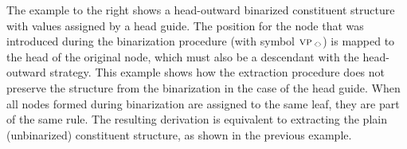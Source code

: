\documentclass[../../document.tex]{subfiles}
\begin{document}
    \begin{wrapfigure}[6]{r}{0pt}
        
    \end{wrapfigure}
    \parexample
    The example to the right shows a head-outward binarized constituent structure with values assigned by a head guide.
    The position for the node that was introduced during the binarization procedure (with symbol \(\cn{vp\,\binsym{}}\)) is mapped to the head of the original node, which must also be a descendant with the head-outward strategy.
    This example shows how the extraction procedure does not preserve the structure from the binarization in the case of the head guide.
    When all nodes formed during binarization are assigned to the same leaf, they are part of the same rule.
    The resulting derivation is equivalent to extracting the plain (unbinarized) constituent structure, as shown in the previous example.
    \begin{center}
        
    \end{center}

    \ifSubfilesClassLoaded{%
        \printindex
    }{}
\end{document}
